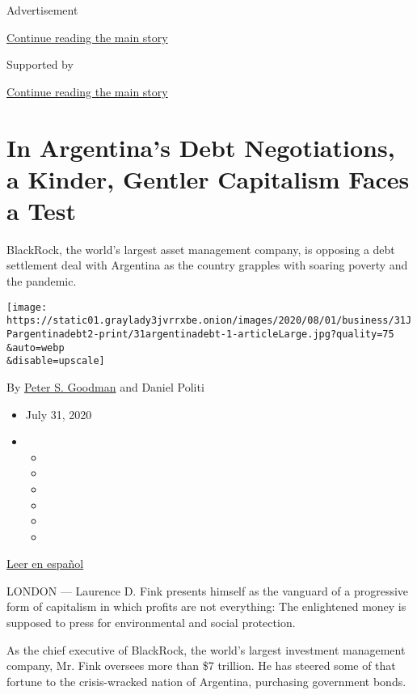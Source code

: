 Advertisement

\protect\hyperlink{after-top}{Continue reading the main story}

Supported by

\protect\hyperlink{after-sponsor}{Continue reading the main story}

\hypertarget{in-argentinas-debt-negotiations-a-kinder-gentler-capitalism-faces-a-test}{%
\section{In Argentina's Debt Negotiations, a Kinder, Gentler Capitalism
Faces a
Test}\label{in-argentinas-debt-negotiations-a-kinder-gentler-capitalism-faces-a-test}}

BlackRock, the world's largest asset management company, is opposing a
debt settlement deal with Argentina as the country grapples with soaring
poverty and the pandemic.

\texttt{[image: https://static01.graylady3jvrrxbe.onion/images/2020/08/01/business/31JPargentinadebt2-print/31argentinadebt-1-articleLarge.jpg?quality=75\\\&auto=webp\\\&disable=upscale]}

By \href{https://www.nytimes3xbfgragh.onion/by/peter-s-goodman}{Peter S.
Goodman} and Daniel Politi

\begin{itemize}
\item
  July 31, 2020
\item
  \begin{itemize}
  \item
  \item
  \item
  \item
  \item
  \item
  \end{itemize}
\end{itemize}

\href{https://www.nytimes3xbfgragh.onion/es/2020/07/31/espanol/negocios/argentina-deuda.html}{Leer
en español}

LONDON --- Laurence D. Fink presents himself as the vanguard of a
progressive form of capitalism in which profits are not everything: The
enlightened money is supposed to press for environmental and social
protection.

As the chief executive of BlackRock, the world's largest investment
management company, Mr. Fink oversees more than \$7 trillion. He has
steered some of that fortune to the crisis-wracked nation of Argentina,
purchasing government bonds.


